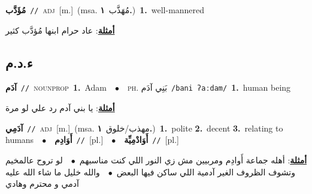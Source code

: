 \documentclass[10pt,a4paper,twoside]{article} %
\begin{document}
\begin{multicols}{2}
{{{{{{{{{{{\setlength\topsep{0pt}\textbf{\foreignlanguage{arabic}{مُؤَدَّب}}\ {\color{gray}\texttt{//}\color{black}}\ \textsc{adj}\ [m.]\ \color{gray}(msa. \foreignlanguage{arabic}{مُهَذَّب}~\foreignlanguage{arabic}{\textbf{١.}})\color{black}\ \textbf{1.}~well-mannered\  \begin{flushright}\color{gray}\foreignlanguage{arabic}{\textbf{\underline{\foreignlanguage{arabic}{أمثلة}}}: عاد حرام ابنها مُؤدَّب كثير}\end{flushright}\color{black}} \vspace{2mm}

\vspace{-3mm}
\subsection*{\color{blue}\foreignlanguage{arabic}{ء.د.م}\color{blue}{}} 

{\setlength\topsep{0pt}\textbf{\foreignlanguage{arabic}{آدَم}}\ {\color{gray}\texttt{//}\color{black}}\ \textsc{noun\textunderscore prop}\ \textbf{1.}~Adam\ \ $\bullet$\ \ \textsc{ph.} \color{gray} \foreignlanguage{arabic}{بَنِي آدَم}\color{black}\ {\color{gray}\texttt{/{\sffamily bani ʔaːdam}/}\color{black}}\ \textbf{1.}~human being\  \begin{flushright}\color{gray}\foreignlanguage{arabic}{\textbf{\underline{\foreignlanguage{arabic}{أمثلة}}}: يا بني آدم رد علي لو مرة}\end{flushright}\color{black}} \vspace{2mm}

{\setlength\topsep{0pt}\textbf{\foreignlanguage{arabic}{آدَمِي}}\ {\color{gray}\texttt{//}\color{black}}\ \textsc{adj}\ [m.]\ \color{gray}(msa. \foreignlanguage{arabic}{مهذب/خلوق}~\foreignlanguage{arabic}{\textbf{١.}})\color{black}\ \textbf{1.}~polite  \textbf{2.}~decent  \textbf{3.}~relating to humans\ \ $\bullet$\ \ \setlength\topsep{0pt}\textbf{\foreignlanguage{arabic}{أَوَادِم}}\ {\color{gray}\texttt{//}\color{black}}\ [pl.]\ \ $\bullet$\ \ \setlength\topsep{0pt}\textbf{\foreignlanguage{arabic}{أَوَادْمِيِّة}}\ {\color{gray}\texttt{//}\color{black}}\ [pl.]\  \begin{flushright}\color{gray}\foreignlanguage{arabic}{\textbf{\underline{\foreignlanguage{arabic}{أمثلة}}}: أهله جماعة أَوادِم ومربيين مش زي النور اللي كنت مناسبهم\ $\bullet$\ \  لو تروح عالمخيم وتشوف الظروف الغير آدمية اللي ساكن فيها البعض\ $\bullet$\ \  والله خليل ما شاء الله عليه آدمي و محترم وهادي}\end{flushright}\color{black}} \vspace{2mm}

}}}}}}}}}}
\end{multicols}
\end{document}
